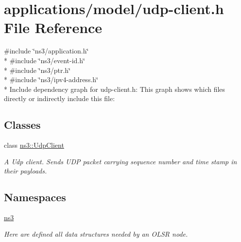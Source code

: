 \hypertarget{udp-client_8h}{}\section{applications/model/udp-\/client.h File Reference}
\label{udp-client_8h}
{\ttfamily \#include \char`\"{}ns3/application.\+h\char`\"{}}\\*
{\ttfamily \#include \char`\"{}ns3/event-\/id.\+h\char`\"{}}\\*
{\ttfamily \#include \char`\"{}ns3/ptr.\+h\char`\"{}}\\*
{\ttfamily \#include \char`\"{}ns3/ipv4-\/address.\+h\char`\"{}}\\*
Include dependency graph for udp-\/client.h\+:
This graph shows which files directly or indirectly include this file\+:
\subsection*{Classes}
\begin{DoxyCompactItemize}
\item 
class \hyperlink{classns3_1_1UdpClient}{ns3\+::\+Udp\+Client}
\begin{DoxyCompactList}\small\item\em A Udp client. Sends U\+DP packet carrying sequence number and time stamp in their payloads. \end{DoxyCompactList}\end{DoxyCompactItemize}
\subsection*{Namespaces}
\begin{DoxyCompactItemize}
\item 
 \hyperlink{namespacens3}{ns3}
\begin{DoxyCompactList}\small\item\em Here are defined all data structures needed by an O\+L\+SR node. \end{DoxyCompactList}\end{DoxyCompactItemize}

